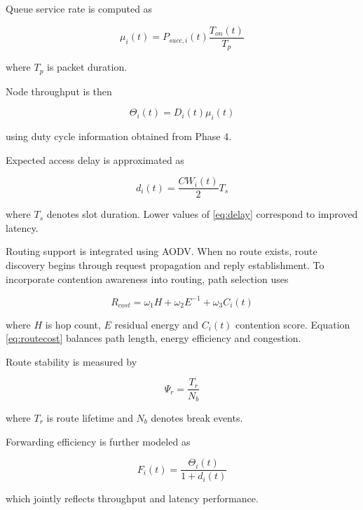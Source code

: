 \documentclass[a4paper,fleqn,final,1p]{cas-dc}
\numberwithin{equation}{section}
\begin{document}
Queue service rate is computed as

\begin{equation}
\mu_i(t)=
P_{succ,i}(t)
\frac{T_{on}(t)}{T_p}
\label{eq:service}
\end{equation}

where $T_p$ is packet duration.

Node throughput is then

\begin{equation}
\Theta_i(t)=D_i(t)\mu_i(t)
\label{eq:throughput}
\end{equation}

using duty cycle information obtained from Phase 4.

Expected access delay is approximated as

\begin{equation}
d_i(t)=
\frac{CW_i(t)}{2}T_s
\label{eq:delay}
\end{equation}

where $T_s$ denotes slot duration. Lower values of \ref{eq:delay} correspond to improved latency.

Routing support is integrated using AODV. When no route exists, route discovery begins through request propagation and reply establishment. To incorporate contention awareness into routing, path selection uses

\begin{equation}
R_{cost}
=
\omega_1H
+\omega_2E^{-1}
+\omega_3C_i(t)
\label{eq:routecost}
\end{equation}

where $H$ is hop count, $E$ residual energy and $C_i(t)$ contention score. Equation \ref{eq:routecost} balances path length, energy efficiency and congestion.

Route stability is measured by

\begin{equation}
\Psi_r=
\frac{T_r}{N_b}
\label{eq:routestability}
\end{equation}

where $T_r$ is route lifetime and $N_b$ denotes break events.

Forwarding efficiency is further modeled as

\begin{equation}
F_i(t)=
\frac{\Theta_i(t)}
{1+d_i(t)}
\label{eq:forwarding}
\end{equation}

which jointly reflects throughput and latency performance.
\end{document}
